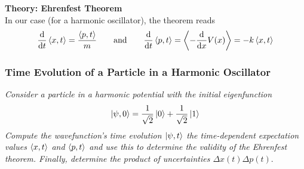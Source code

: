 \documentclass[11pt, a4paper]{article}
\newcommand{\eqtext}[1]{\qquad \text{#1} \qquad}
\begin{document}
\textbf{Theory: Ehrenfest Theorem}\\
In our case (for a harmonic oscillator), the theorem reads
\begin{equation*}
	\dv{t}\ev{x, t} = \frac{\ev{p, t}}{m} \eqtext{and} \dv{t}\ev{p, t} = \ev{-\dv{x}V(x)} = -k\ev{x, t}
\end{equation*}


\subsubsection{Time Evolution of a Particle in a Harmonic Oscillator}
\textit{Consider a particle in a harmonic potential with the initial eigenfunction}
\begin{equation*}
	\ket{\psi, 0} = \frac{1}{\sqrt{2}}\ket{0} + \frac{1}{\sqrt{2}}\ket{1}
\end{equation*}
\textit{Compute the wavefunction's time evolution $ \ket{\psi, t} $ the time-dependent expectation values $ \ev{x, t} $ and $ \ev{p, t} $ and use this to determine the validity of the Ehrenfest theorem. Finally, determine the product of uncertainties $ \Delta x(t) \Delta p(t) $}.
\end{document}
